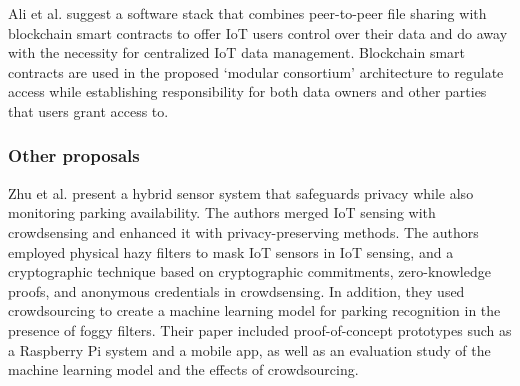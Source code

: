 \documentclass[conference]{IEEEtran}
\begin{document}

Ali et al. \cite{AliIoT} suggest a software stack that combines peer-to-peer
file sharing with blockchain smart contracts to offer IoT users control over
their data and do away with the necessity for centralized IoT data management.
Blockchain smart contracts are used in the proposed `modular consortium'
architecture to regulate access while establishing responsibility for both
data owners and other parties that users grant access to.

\subsubsection{Other proposals}


Zhu et al. \cite{ZhuIntegrating} present a hybrid sensor system that safeguards
privacy while also monitoring parking availability. The authors merged IoT
sensing with crowdsensing and enhanced it with privacy-preserving methods.
The authors employed physical hazy filters to mask IoT sensors in IoT sensing,
and a cryptographic technique based on cryptographic commitments, zero-knowledge
proofs, and anonymous credentials in crowdsensing. In addition, they used
crowdsourcing to create a machine learning model for parking recognition
in the presence of foggy filters. Their paper included proof-of-concept prototypes
such as a Raspberry Pi system and a mobile app, as well as an evaluation
study of the machine learning model and the effects of crowdsourcing.

\end{document}
